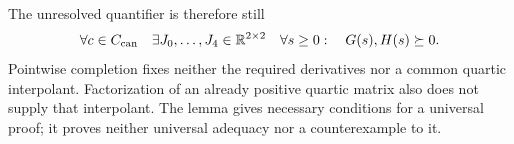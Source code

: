 \documentclass[11pt]{article}
\newcommand{\R}{\mathbb R}
\begin{document}
The unresolved quantifier is therefore still
\[
 \forall c\in C_{\rm can}\quad\exists J_0,\ldots,J_4\in\R^{2\times2}
 \quad\forall s\ge0:\quad G(s),H(s)\succeq0.
\]
Pointwise completion fixes neither the required derivatives nor a common
quartic interpolant. Factorization of an already positive quartic
matrix also does not supply that interpolant. The lemma gives necessary
conditions for a universal proof; it proves neither universal adequacy
nor a counterexample to it.
\end{document}
